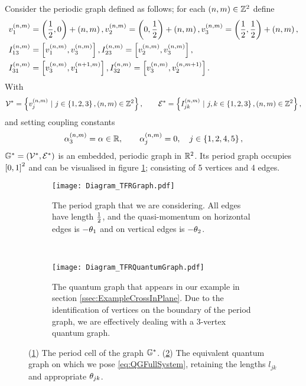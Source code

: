 Consider the periodic graph defined as follows; for each $\left( n,m \right)\in\mathbb{Z}^2$ define
\begin{align*}
	& v_1^{\left( n,m \right)} = \left( \frac{1}{2},0 \right) + \left( n,m \right), 
	v_2^{\left( n,m \right)} = \left( 0,\frac{1}{2} \right) + \left( n,m \right),
	v_3^{\left( n,m \right)} = \left( \frac{1}{2},\frac{1}{2} \right) + \left( n,m \right), \\
	& I_{13}^{\left( n,m \right)} = \left[ v_1^{\left( n,m \right)}, v_3^{\left( n,m \right)} \right],
	I_{23}^{\left( n,m \right)} = \left[ v_2^{\left( n,m \right)}, v_3^{\left( n,m \right)} \right], \\
	& I_{31}^{\left( n,m \right)} = \left[ v_3^{\left( n,m \right)}, v_1^{\left( n+1,m \right)} \right],
	I_{32}^{\left( n,m \right)} = \left[ v_3^{\left( n,m \right)}, v_2^{\left( n,m+1 \right)} \right].
\end{align*}
With 
\begin{align*}
	\vertSet^* = \clbracs{v_j^{\bracs{n,m}} \ \vert \ j\in\clbracs{1,2,3}, \bracs{n,m}\in\integers^2},
	\qquad \edgeSet^* = \clbracs{I_{jk}^{\bracs{n,m}} \ \vert \ j,k\in\clbracs{1,2,3}, \bracs{n,m}\in\integers^2},
\end{align*}
and setting coupling constants
\begin{align*}
	\alpha_3^{\left( n,m \right)} = \alpha \in\mathbb{R}, 
	\qquad \alpha_j^{\left( n,m \right)} = 0, \quad j\in\left\{ 1,2,4,5 \right\},
\end{align*}
$\mathbb{G}^* = \left( \mathcal{V}^*,\mathcal{E}^* \right)$ is an embedded, periodic graph in $\mathbb{R}^2$.
Its period graph occupies $\left[ 0,1 \right]^2$ and can be visualised in figure \ref{fig:Diagram_TFRGraph}; consisting of 5 vertices and 4 edges.
\begin{figure}[b!]
	\centering
	\begin{subfigure}[t]{0.45\textwidth}
		\centering
		\texttt{[image: Diagram\_TFRGraph.pdf]}
		\caption{\label{fig:Diagram_TFRGraph} The period graph that we are considering. All edges have length $\frac{1}{2}$, and the quasi-momentum on horizontal edges is $-\theta_1$ and on vertical edges is $-\theta_2$.}
	\end{subfigure}
	~
	\begin{subfigure}[t]{0.45\textwidth}
		\centering
		\texttt{[image: Diagram\_TFRQuantumGraph.pdf]}
		\caption{\label{fig:Diagram_TFRQuantumGraph} The quantum graph that appears in our example in section \ref{ssec:ExampleCrossInPlane}. Due to the identification of vertices on the boundary of the period graph, we are effectively dealing with a 3-vertex quantum graph.}
	\end{subfigure}
	\caption{\label{fig:5VertexCross} (\ref{fig:Diagram_TFRGraph}) The period cell of the graph $\mathbb{G}^*$. (\ref{fig:Diagram_TFRQuantumGraph}) The equivalent quantum graph on which we pose \eqref{eq:QGFullSystem}, retaining the lengths $l_{jk}$ and appropriate $\theta_{jk}$.}
\end{figure}
